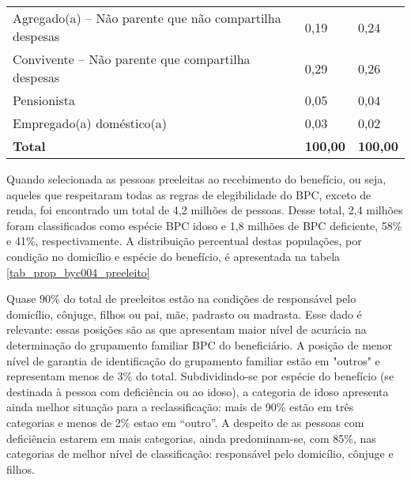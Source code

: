 \documentclass[
	12pt,				%
	openright,			%
	twoside,			%
	a4paper,			%
	english,			%
	french,				%
	spanish,			%
	brazil				%
	]{abntex2}
\begin{document}
\begin{table}[h]
\begin{tabular}{@{}lm{4cm}m{3cm}@{}}
		Agregado(a) – Não parente que não compartilha despesas & 0,19                            & 0,24            \\
		Convivente – Não parente que compartilha despesas      & 0,29                            & 0,26            \\
		Pensionista                                            & 0,05                            & 0,04            \\
		Empregado(a) doméstico(a)                              & 0,03                            & 0,02            \\ \midrule
		\textbf{Total}                                         & \textbf{100,00}                 & \textbf{100,00} \\ \bottomrule
	\end{tabular}
\end{table}

Quando selecionada as pessoas preeleitas ao recebimento do benefício, ou seja, aqueles que respeitaram todas as regras de elegibilidade do BPC, exceto de renda, foi encontrado um total de 4,2 milhões de pessoas. Desse total, 2,4 milhões foram classificados como espécie BPC idoso e 1,8 milhões de BPC deficiente, 58\% e 41\%, respectivamente. A distribuição percentual destas populações, por condição no domicílio e espécie do benefício, é apresentada na tabela \ref*{tab_prop_byc004_preeleito}


Quase 90\% do total de preeleitos estão na condições de responsável pelo domicílio, cônjuge, filhos ou pai, mãe, padrasto ou madrasta. Esse dado é relevante: essas posições são as que apresentam maior nível de acurácia na determinação do grupamento familiar BPC do beneficiário. A posição de menor nível de garantia de identificação do grupamento familiar estão em "outros" e representam  menos de 3\% do total. Subdividindo-se por espécie do benefício (se destinada à pessoa com deficiência ou ao idoso), a categoria de idoso apresenta ainda melhor situação para a reclassificação: mais de 90\% estão em três categorias e menos de 2\% estao em ``outro''. A despeito de as pessoas com deficiência estarem em mais categorias, ainda predominam-se, com 85\%, nas categorias de melhor nível de classificação: responsável pelo domicílio, cônjuge e filhos.
 
\end{document}
